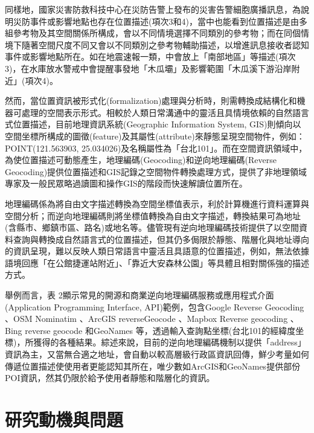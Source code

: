 同樣地，國家災害防救科技中心在災防告警上發布的災害告警細胞廣播訊息，為說明災防事件或影響地點也存在位置描述(項次3和4)，當中也能看到位置描述是由多組參考物及其空間關係所構成，會以不同情境選擇不同類別的參考物；而在同個情境下隨著空間尺度不同又會以不同類別之參考物輔助描述，以增進訊息接收者認知事件或影響地點所在。如在地震速報一類，中會放上「南部地區」等描述(項次3)，在水庫放水警戒中會提醒事發地「木瓜壩」及影響範圍「木瓜溪下游沿岸附近」(項次4)。



然而，當位置資訊被形式化(formalization)處理與分析時，則需轉換成結構化和機器可處理的空間表示形式。相較於人類日常溝通中的靈活且具情境依賴的自然語言式位置描述，目前地理資訊系統(Geographic Information System, GIS)則傾向以空間坐標所構成的圖徵(feature)及其屬性(attribute)來靜態呈現空間物件\citep{RN126}，例如：POINT(121.563903, 25.034026)及名稱屬性為「台北101」。而在空間資訊領域中，為使位置描述可動態產生，地理編碼(Geocoding)和逆向地理編碼(Reverse Geocoding)提供位置描述和GIS記錄之空間物件轉換處理方式，提供了非地理領域專家及一般民眾略過讀圖和操作GIS的階段而快速解讀位置所在。

地理編碼係為將自由文字描述轉換為空間坐標值表示，利於計算機進行資料運算與空間分析；而逆向地理編碼則將坐標值轉換為自由文字描述，轉換結果可為地址(含縣市、鄉鎮市區、路名)或地名等\citep{RN18, RN17}。儘管現有逆向地理編碼技術提供了以空間資料查詢與轉換成自然語言式的位置描述，但其仍多侷限於靜態、階層化與地址導向的資訊呈現，難以反映人類日常語言中靈活且具語意的位置描述\citep{RN122}，例如，無法依據語境回應「在公館捷運站附近」、「靠近大安森林公園」等具體且相對關係強的描述方式。

舉例而言，表 2顯示常見的開源和商業逆向地理編碼服務或應用程式介面(Application Programming Interface, API)範例，包含Google Reverse Geocoding \citep{RN175}、OSM Nominatim \citep{RN176}、ArcGIS reverseGeocode \citep{RN177}、Mapbox Reverse geocoding \citep{RN178}、 Bing reverse geocode \citep{RN179}和GeoNames \citep{RN180}等，透過輸入查詢點坐標(台北101的經緯度坐標)，所獲得的各種結果。綜述來說，目前的逆向地理編碼機制以提供「address」資訊為主，又當無合適之地址，會自動以較高層級行政區資訊回傳，鮮少考量如何傳遞位置描述使使用者更能認知其所在，唯少數如ArcGIS和GeoNames提供部份POI資訊，然其仍限於給予使用者靜態和階層化的資訊。



\section{研究動機與問題}

